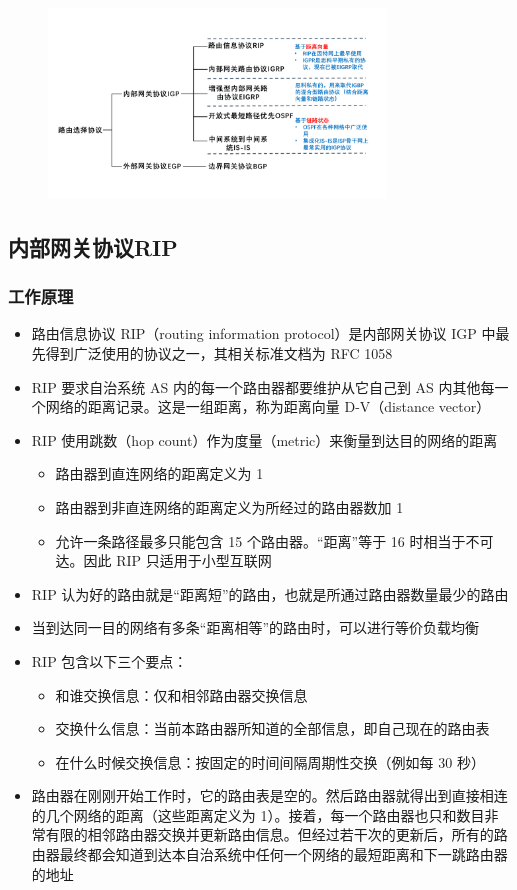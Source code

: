 \documentclass[cs4size,a4paper,10pt]{ctexart}
\begin{document}
	\begin{figure}[H]
		\centering
		\includegraphics[width=0.8\textwidth]{img/4.5.2}
	\end{figure}

	\subsection{内部网关协议RIP}

	\subsubsection{工作原理}
	\begin{itemize}
		\item 路由信息协议 RIP（routing information protocol）是内部网关协议 IGP 中最先得到广泛使用的协议之一，其相关标准文档为 RFC 1058
		\item RIP 要求自治系统 AS 内的每一个路由器都要维护从它自己到 AS 内其他每一个网络的距离记录。这是一组距离，称为距离向量 D-V（distance vector）
		\item RIP 使用跳数（hop count）作为度量（metric）来衡量到达目的网络的距离
		\begin{itemize}
			\item 路由器到直连网络的距离定义为 1
			\item 路由器到非直连网络的距离定义为所经过的路由器数加 1
			\item 允许一条路径最多只能包含 15 个路由器。“距离”等于 16 时相当于不可达。因此 RIP 只适用于小型互联网
		\end{itemize}
		\item RIP 认为好的路由就是“距离短”的路由，也就是所通过路由器数量最少的路由
		\item 当到达同一目的网络有多条“距离相等”的路由时，可以进行等价负载均衡
		\item RIP 包含以下三个要点：
		\begin{itemize}
			\item 和谁交换信息：仅和相邻路由器交换信息
			\item 交换什么信息：当前本路由器所知道的全部信息，即自己现在的路由表
			\item 在什么时候交换信息：按固定的时间间隔周期性交换（例如每 30 秒）
		\end{itemize}
		\item 路由器在刚刚开始工作时，它的路由表是空的。然后路由器就得出到直接相连的几个网络的距离（这些距离定义为 1）。接着，每一个路由器也只和数目非常有限的相邻路由器交换并更新路由信息。但经过若干次的更新后，所有的路由器最终都会知道到达本自治系统中任何一个网络的最短距离和下一跳路由器的地址
	\end{itemize}
\end{document}
